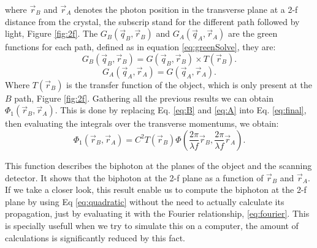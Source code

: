 where $\vec{r}_B$ and $\vec{r}_A$ denotes the photon position in the transverse plane at a 2-f distance from the 
crystal, the subscrip stand for the different path followed by light, Figure \ref{fig:2f}. The $G_B(\vec{q}_B,\vec{r}_B)$
and $G_A(\vec{q}_A,\vec{r}_A)$ are the green functions for each path, defined as in equation \ref{eq:greenSolve}, they are:
\begin{equation}\label{eq:B}
G_B(\vec{q}_B,\vec{r}_B)=G(\vec{q}_B,\vec{r}_B) \times T(\vec{r}_B) .
\end{equation}
\begin{equation}\label{eq:A}
G_A(\vec{q}_A,\vec{r}_A)=G(\vec{q}_A,\vec{r}_A).
\end{equation}
Where $T(\vec{r}_B)$ is the transfer function of the object, which is only present at the $B$ path, Figure \ref{fig:2f}.
Gathering all the previous results we can obtain $\Phi_1 (\vec{r}_B , \vec{r}_A )$. This is done by replacing
Eq. \ref{eq:B} and \ref{eq:A} into Eq. \ref{eq:final}, then evaluating the integrals over the transverse 
momentums, we obtain:
\begin{equation}\label{eq:finalBiphoton}
\Phi_1 (\vec{r}_B , \vec{r}_A )=C^2 T(\vec{r}_B) \Phi (\frac{2 \pi}{\lambda f}\vec{r}_B, \frac{2 \pi}{\lambda f}\vec{r}_A).
\end{equation}

This function describes the biphoton at the planes of the object and the scanning detector. It shows 
that the biphoton at the 2-f plane as a function of $\vec{r}_B$ and $\vec{r}_A$. If we take a closer look, this result
enable us to compute the biphoton at the 2-f plane by using Eq \ref{eq:quadratic} without the need to actually calculate its propagation, just by 
evaluating it with the Fourier relationship, \ref{eq:fourier}. This is specially usefull when we try to 
simulate this on a computer, the amount of calculations is significantly reduced by this fact.


